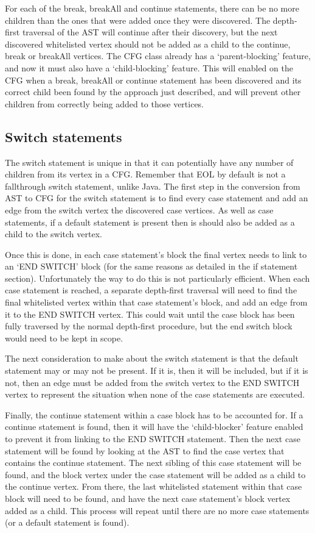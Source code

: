 For each of the break, breakAll and continue statements, there can be no more children than the ones that were added once they were discovered. The depth-first traversal of the AST will continue after their discovery, but the next discovered whitelisted vertex should not be added as a child to the continue, break or breakAll vertices. The CFG class already has a `parent-blocking' feature, and now it must also have a `child-blocking' feature. This will enabled on the CFG when a break, breakAll or continue statement has been discovered and its correct child been found by the approach just described, and will prevent other children from correctly being added to those vertices.
\subsection{Switch statements}

The switch statement is unique in that it can potentially have any number of children from its vertex in a CFG. Remember that EOL by default is not a fallthrough switch statement, unlike Java. The first step in the conversion from AST to CFG for the switch statement is to find every case statement and add an edge from the switch vertex the discovered case vertices. As well as case statements, if a default statement is present then is should also be added as a child to the switch vertex.

Once this is done, in each case statement's block the final vertex needs to link to an `END SWITCH' block (for the same reasons as detailed in the if statement section). Unfortunately the way to do this is not particularly efficient. When each case statement is reached, a separate depth-first traversal will need to find the final whitelisted vertex within that case statement's block, and add an edge from it to the END SWITCH vertex. This could wait until the case block has been fully traversed by the normal depth-first procedure, but the end switch block would need to be kept in scope.

The next consideration to make about the switch statement is that the default statement may or may not be present. If it is, then it will be included, but if it is not, then an edge must be added from the switch vertex to the END SWITCH vertex to represent the situation when none of the case statements are executed.

Finally, the continue statement within a case block has to be accounted for. If a continue statement is found, then it will have the `child-blocker' feature enabled to prevent it from linking to the END SWITCH statement. Then the next case statement will be found by looking at the AST to find the case vertex that contains the continue statement. The next sibling of this case statement will be found, and the block vertex under the case statement will be added as a child to the continue vertex. From there, the last whitelisted statement within that case block will need to be found, and have the next case statement's block vertex added as a child. This process will repeat until there are no more case statements (or a default statement is found).

